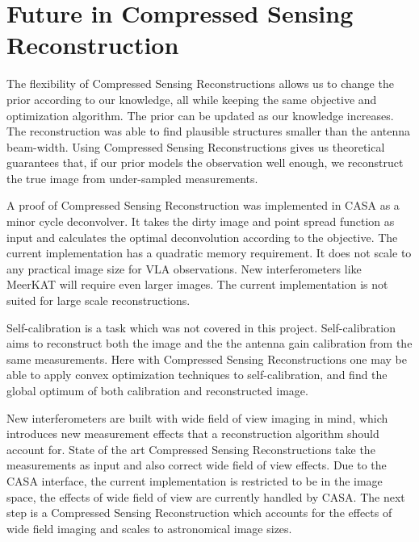 \section{Future in Compressed Sensing Reconstruction}
The flexibility of Compressed Sensing Reconstructions allows us to change the prior according to our knowledge, all while keeping the same objective and optimization algorithm. The prior can be updated as our knowledge increases. The reconstruction was able to find plausible structures smaller than the antenna beam-width. Using Compressed Sensing Reconstructions gives us theoretical guarantees that, if our prior models the observation well enough, we reconstruct the true image from under-sampled measurements.

A proof of Compressed Sensing Reconstruction was implemented in CASA as a minor cycle deconvolver. It takes the dirty image and point spread function as input and calculates the optimal deconvolution according to the objective. The current implementation has a quadratic memory requirement. It does not scale to any practical image size for VLA observations. New interferometers like MeerKAT will require even larger images. The current implementation is not suited for large scale reconstructions. 

Self-calibration is a task which was not covered in this project. Self-calibration aims to reconstruct both the image and the the antenna gain calibration from the same measurements. Here with Compressed Sensing Reconstructions one may be able to apply convex optimization techniques to self-calibration, and find the global optimum of both calibration and reconstructed image.

New interferometers are built with wide field of view imaging in mind, which introduces new measurement effects that a reconstruction algorithm should account for. State of the art Compressed Sensing Reconstructions take the measurements as input and also correct wide field of view effects. Due to the CASA interface, the current implementation is restricted to be in the image space, the effects of wide field of view are currently handled by CASA. The next step is a Compressed Sensing Reconstruction which accounts for the effects of wide field imaging and scales to astronomical image sizes.